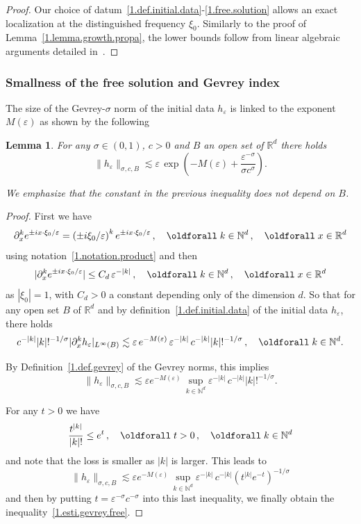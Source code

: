 \documentclass[10pt]{amsart}
\newtheorem{lemm}[cdrthm]{Lemma}
\theoremstyle{definition}
\theoremstyle{plain}
\newcommand*\e{\varepsilon}
\newcommand*\R{{\mathbb R}}
\newcommand*\N{{\mathbb N}}
\newcommand{\dptl}{\partial}%
\newcommand*\dsp{\displaystyle}
\renewcommand*{\forall}{\mathrel{\oldforall}}
\begin{document}
\begin{proof}
Our choice of datum~\eqref{1.def.initial.data}-\eqref{1.free.solution} allows an exact localization at the distinguished frequency $\xi_0$. Similarly to the proof of Lemma~\ref{1.lemma.growth.propa}, the lower bounds follow from linear algebraic arguments detailed in~\cite{lerner2015onset}.
\end{proof}


\subsubsection{Smallness of the free solution and Gevrey index}


The size of the Gevrey-$\sigma$ norm of the initial data $h_{\e}$ is linked to the exponent $M(\e)$ as shown by the following

\begin{lemm}\label{1.size.gevrey.exp}
For any $\sigma\in(0,1)$, $c>0$ and $B$ an open set of $\R^{d}$ there holds
\begin{equation}\label{1.esti.gevrey.free}
\dsp \|h_{\e}\|_{\sigma,c,B} \lesssim \e\,\exp\left(- M(\e) + \frac{\e^{-\sigma}}{\sigma c^{\sigma}}\right).
\end{equation}


We emphasize that the constant in the previous inequality does not depend on $B$.
\end{lemm}

\begin{proof}
First we have
\[
\dsp \dptl_{x}^{k} e^{\pm ix\cdot\xi_{0}/\e} = \left(\pm i\xi_{0}/\e\right)^{k}e^{\pm ix\cdot\xi_{0}/\e} \,,\quad \forall k\in\N^{d} \,,\quad \forall x\in\R^{d}
\]
using notation~\eqref{1.notation.product} and then
\[
\dsp |\dptl_{x}^{k} e^{\pm ix\cdot\xi_{0}/\e}| \leq C_d \, \e^{-|k|} \,,\quad \forall k\in\N^{d} \,,\quad \forall x\in\R^{d}
\]
as $|\xi_{0}| = 1$, with $C_d>0$ a constant depending only of the dimension $d$. So that for any open set $B$ of $\R^{d}$ and by definition~\eqref{1.def.initial.data} of the initial data $h_{\e}$, there holds
\[
\dsp c^{-|k|}|k|!^{-1/\sigma} |\dptl_{x}^{k} h_{\e} |_{L^{\infty}(B)} \lesssim \e\, e^{-M(\e)} \,\e^{-|k|}\,c^{-|k|} |k|!^{-1/\sigma} \,,\quad \forall k\in\N^{d}.
\]


By Definition~\ref{1.def.gevrey} of the Gevrey norms, this implies
\[
\dsp \|h_{\e}\|_{\sigma,c,B} \lesssim \e e^{-M(\e)} \, \sup_{k\in\N^{d}} \e^{-|k|}\,c^{-|k|} |k|!^{-1/\sigma}.
\]


For any $t>0$ we have
\[
\frac{t^{|k|}}{|k|!} \leq e^{t}\,, \quad \forall t>0 \,, \quad \forall k\in\N^{d}
\]
and note that the loss is smaller as $|k|$ is larger. This leads to
\[
\|h_{\e}\|_{\sigma,c,B} \lesssim \e e^{-M(\e)} \, \sup_{k\in\N^{d}} \e^{-|k|}\,c^{-|k|} \left(t^{|k|}e^{-t}\right)^{-1/\sigma}
\]
and then by putting $t = \e^{-\sigma}c^{-\sigma}$ into this last inequality, we finally obtain the inequality~\eqref{1.esti.gevrey.free}.
\end{proof}
\end{document}
